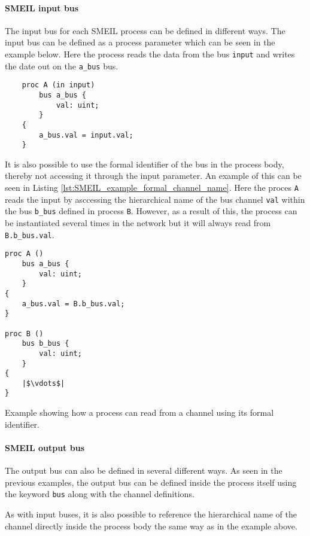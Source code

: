 \paragraph{SMEIL input bus}
The input bus for each SMEIL process can be defined in different ways. The input bus can be defined as a process parameter which can be seen in the example below. Here the process reads the data from the bus \texttt{input} and writes the date out on the \texttt{a\_bus} bus.
\begin{verbatim}
    proc A (in input)
        bus a_bus {
            val: uint;
        }
    {
        a_bus.val = input.val;
    }
\end{verbatim}
It is also possible to use the formal identifier of the bus in the process body, thereby not accessing it through the input parameter. An example of this can be seen in Listing \ref{lst:SMEIL_example_formal_channel_name}. Here the proces \texttt{A} reads the input by asccessing the hierarchical name of the bus channel \texttt{val} within the bus \texttt{b\_bus} defined in process \texttt{B}. However, as a result of this, the process can be instantiated several times in the network but it will always read from \texttt{B.b\_bus.val}.
\begin{listing}
\begin{verbatim}
proc A ()
    bus a_bus {
        val: uint;
    }
{
    a_bus.val = B.b_bus.val;
}

proc B ()
    bus b_bus {
        val: uint;
    }
{
    |$\vdots$|
}
\end{verbatim}
\caption{Example showing how a process can read from a channel using its formal identifier.}
\label{lst:SMEIL_example_formal_channel_name}
\end{listing}


\paragraph{SMEIL output bus}
The output bus can also be defined in several different ways.
As seen in the previous examples, the output bus can be defined inside the process itself using the keyword \texttt{bus} along with the channel definitions.

As with input buses, it is also possible to reference the hierarchical name of the channel directly inside the process body the same way as in the example above.

